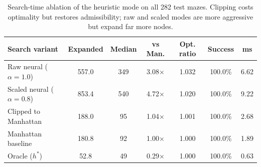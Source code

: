 \begin{table}[H]
\centering
\small
\begin{tabular}{lcccccc}
\toprule
\textbf{Search variant} & \textbf{Expanded} & \textbf{Median} & \textbf{vs Man.} & \textbf{Opt. ratio} & \textbf{Success} & \textbf{ms} \\
\midrule
Raw neural ($\alpha=1.0$) & 557.0 & 349 & 3.08$\times$ & 1.032 & 100.0\% & 6.62 \\
Scaled neural ($\alpha=0.8$) & 853.4 & 540 & 4.72$\times$ & 1.020 & 100.0\% & 9.22 \\
Clipped to Manhattan & 188.0 & 95 & 1.04$\times$ & 1.001 & 100.0\% & 2.68 \\
Manhattan baseline & 180.8 & 92 & 1.00$\times$ & 1.000 & 100.0\% & 1.89 \\
Oracle ($h^\ast$) & 52.8 & 49 & 0.29$\times$ & 1.000 & 100.0\% & 0.63 \\
\bottomrule
\end{tabular}
\caption{Search-time ablation of the heuristic mode on all 282 test mazes.
Clipping costs optimality but restores admissibility; raw and scaled modes are
more aggressive but expand far more nodes.}
\label{tab:search_mode_ablation}
\end{table}
